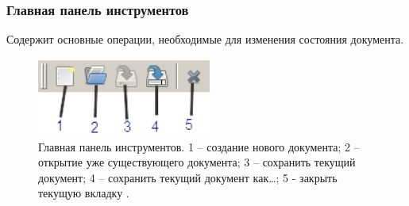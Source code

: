 \subsubsection{Главная панель инструментов}
Содержит основные операции, необходимые для изменения состояния документа.
\begin{figure}[h]
	\includegraphics[width=5.72cm, height=2.57cm]{../images/maintoolbar.png}
	\caption{Главная панель инструментов. 1 – создание нового документа; 2 – открытие уже существующего документа; 3 – сохранить 		текущий документ; 4 – сохранить текущий документ как…; 5 - закрыть текущую вкладку .}
	\label{maintoolbar}
\end{figure}